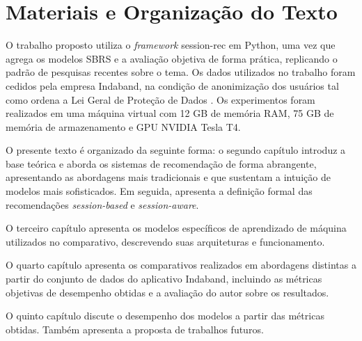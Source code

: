 \section{Materiais e Organização do Texto}

O trabalho proposto utiliza o \textit{framework} session-rec \cite{sessionrec}
em Python, uma vez que agrega os modelos SBRS e a avaliação objetiva de forma
prática, replicando o padrão de pesquisas recentes sobre o tema. Os dados
utilizados no trabalho foram cedidos pela empresa Indaband, na condição de
anonimização dos usuários tal como ordena a Lei Geral de Proteção de
Dados \cite{lgpd}. Os experimentos foram realizados em uma máquina virtual com
12 GB de memória RAM, 75 GB de memória de armazenamento e GPU NVIDIA Tesla T4.

O presente texto é organizado da seguinte forma: o segundo capítulo introduz a
base teórica e aborda os sistemas de recomendação de forma abrangente,
apresentando as abordagens mais tradicionais e que sustentam a intuição de
modelos mais sofisticados. Em seguida, apresenta a definição formal das
recomendações \textit{session-based} e \textit{session-aware}.

O terceiro capítulo apresenta os modelos específicos de aprendizado de máquina
utilizados no comparativo, descrevendo suas arquiteturas e funcionamento.

O quarto capítulo apresenta os comparativos realizados em abordagens distintas a
partir do conjunto de dados do aplicativo Indaband, incluindo as métricas
objetivas de desempenho obtidas e a avaliação do autor sobre os resultados.

O quinto capítulo discute o desempenho dos modelos a partir das métricas
obtidas. Também apresenta a proposta de trabalhos futuros.